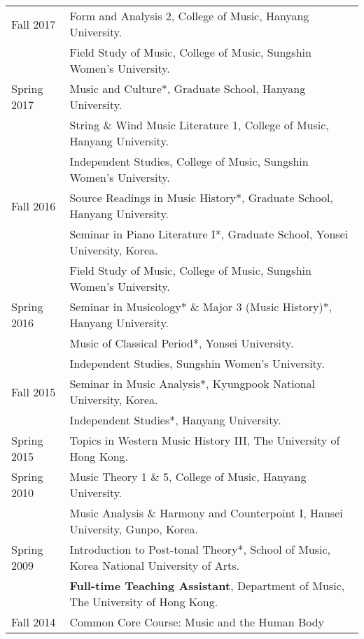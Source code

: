\documentclass[a4paper,11pt]{article}
\begin{document}
\begin{tabular}{p{2.5cm} l}
    Fall 2017 & Form and Analysis 2, College of Music, Hanyang University.\\
    & Field Study of Music, College of Music, Sungshin Women's University.\\

    Spring 2017 & Music and Culture*, Graduate School, Hanyang University.\\
    & String \& Wind Music Literature 1, College of Music, Hanyang University.\\
    & Independent Studies, College of Music, Sungshin Women's University.\\
    
    Fall 2016 & Source Readings in Music History*, Graduate School, Hanyang University.\\
    & Seminar in Piano Literature I*, Graduate School, Yonsei University, Korea.\\
    & Field Study of Music, College of Music, Sungshin Women's University.\\
    
    Spring 2016 & Seminar in Musicology* \& Major 3 (Music History)*, Hanyang University.\\
    & Music of Classical Period*, Yonsei University.\\
    & Independent Studies, Sungshin Women's University.\\
    
    Fall 2015 & Seminar in Music Analysis*, Kyungpook National University, Korea.\\
    & Independent Studies*, Hanyang University.\\
    
    Spring 2015 & Topics in Western Music History III, The University of Hong Kong.\\
    
    Spring 2010 & Music Theory 1 \& 5, College of Music, Hanyang University.\\
    & Music Analysis \& Harmony and Counterpoint I, Hansei University, Gunpo, Korea.\\
    
	Spring 2009 & Introduction to Post-tonal Theory*, School of Music, Korea National University of Arts.\\[2mm]
	
    & \textbf{Full-time Teaching Assistant}, Department of Music, The University of Hong Kong.\\
    Fall 2014 & Common Core Course: Music and the Human Body\\[2mm]
    

\end{tabular}
\end{document}
